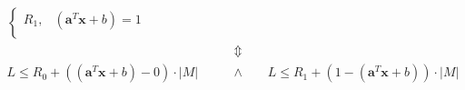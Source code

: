 \documentclass[onecolumn]{ctexart}
\begin{document}
\begin{equation}
\begin{aligned}
\begin{cases}
            R_1           ,  & (\mathbf{a}^T \mathbf{x} + b) = 1  \\
        \end{cases}
        \\
        & \Updownarrow
        \\
        L  \leq  R_0 + ((\mathbf{a}^T \mathbf{x} + b) - 0) \cdot |M|
        \qquad & \land \qquad
        L  \leq  R_1 + (1 - (\mathbf{a}^T \mathbf{x} + b)) \cdot |M|
    \end{aligned}
\end{equation}


\subsection{}


\begin{equation}
    \begin{aligned}
    \end{aligned}
\end{equation}


\begin{equation}
    \begin{aligned}
    \end{aligned}
\end{equation}


\begin{equation}
    \begin{aligned}
    \end{aligned}
\end{equation}


\begin{equation}
    \begin{aligned}
    \end{aligned}
\end{equation}
\end{document}
